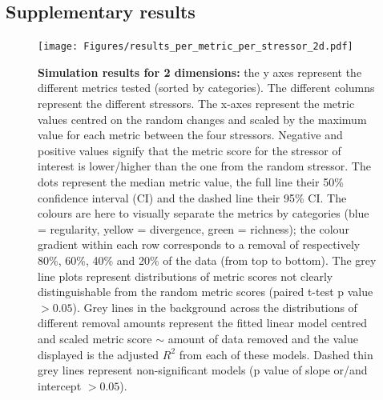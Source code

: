 \documentclass[12pt,letterpaper]{article}
\begin{document}
\newpage



\subsection{Supplementary results}


\begin{figure}[!htbp]
\centering
   \texttt{[image: Figures/results\_per\_metric\_per\_stressor\_2d.pdf]}
\caption{\scriptsize{\textbf{Simulation results for 2 dimensions:} the y axes represent the different metrics tested (sorted by categories).
The different columns represent the different stressors. The x-axes represent the metric values centred on the random changes and scaled by the maximum value for each metric between the four stressors.
Negative and positive values signify that the metric score for the stressor of interest is lower/higher than the one from the random stressor.
The dots represent the median metric value, the full line their 50\% confidence interval (CI) and the dashed line their 95\% CI.
The colours are here to visually separate the metrics by categories (blue = regularity, yellow = divergence, green = richness); the colour gradient within each row corresponds to a removal of respectively 80\%, 60\%, 40\% and 20\% of the data (from top to bottom).
The grey line plots represent distributions of metric scores not clearly distinguishable from the random metric scores (paired t-test p value $> 0.05$).
Grey lines in the background across the distributions of different removal amounts represent the fitted linear model centred and scaled metric score $\sim$ amount of data removed and the value displayed is the adjusted $R^2$ from each of these models.
Dashed thin grey lines represent non-significant models (p value of slope or/and intercept $> 0.05$).
}}
\label{Fig:simulation_results_2d}
\end{figure}
\bigskip
\end{document}
